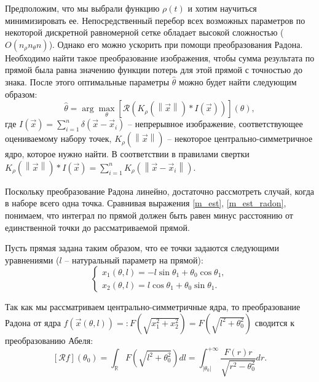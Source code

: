 Предположим, что мы выбрали функцию $\rho(t)$ и хотим научиться минимизировать ее.
Непосредственный перебор всех возможных параметров по некоторой дискретной равномерной сетке обладает высокой сложностью ($O\left( n_\rho n_\theta n \right)$).
Однако его можно ускорить при помощи преобразования Радона.
Необходимо найти такое преобразование изображения, чтобы сумма результата по прямой была равна значению функции потерь для этой прямой с точностью до знака.
После этого оптимальные параметры $\hat\theta$ можно будет найти следующим образом:
\begin{equation}
\label{m_est_radon}
    \hat\theta = \arg\max_{\theta} \left[ \mathcal{R} \left( K_{\rho}\left( \left\| \vec x \right\| \right) * I\left( \vec x \right) \right) \right]\left( \theta \right),
\end{equation}
где $I\left( \vec x \right) = \sum_{i=1}^n \delta\left( \vec x - \vec x_i \right)$ -- непрерывное изображение, соответствующее оцениваемому набору точек, $K_{\rho}\left( \left\| \vec x \right\| \right)$ -- некоторое центрально-симметричное ядро, которое нужно найти.
В соответствии в правилами свертки $K_{\rho}\left( \left\| \vec x \right\| \right) * I\left( \vec x \right) = \sum_{i=1}^n K_\rho\left( \left\| \vec x - \vec x_i \right\| \right)$.

Поскольку преобразование Радона линейно, достаточно рассмотреть случай, когда в наборе всего одна точка. Сравнивая выражения \eqref{m_est}, \eqref{m_est_radon}, понимаем, что интеграл по прямой должен быть равен минус расстоянию от единственной точки до рассматриваемой прямой.

Пусть прямая задана таким образом, что ее точки задаются следующими уравнениями ($l$ -- натуральный параметр на прямой):
\begin{equation*}
    \begin{cases}
        x_1(\theta, l) = -l \sin\theta_1 + \theta_0 \cos\theta_1,\\
        x_2(\theta, l) =  l \cos\theta_1 + \theta_0 \sin\theta_1.
    \end{cases}
\end{equation*}

Так как мы рассматриваем центрально-симметричные ядра, то преобразование Радона от ядра $f\left( \vec x\left( \theta, l \right) \right) =: F\left( \sqrt{x_1^2 + x_2^2} \right) = F\left( \sqrt{l^2 + \theta_0^2} \right)$ сводится к преобразованию Абеля:
\begin{equation*}
    \left[ \mathcal{R}f \right]\left( \theta_0 \right) =
    \int_{\mathbb{R}} F\left( \sqrt{l^2 + \theta_0^2} \right) dl =
    \int_{|\theta_0|}^{+\infty} \frac{F(r)r}{\sqrt{r^2 - \theta_0^2}} dr.
\end{equation*}

